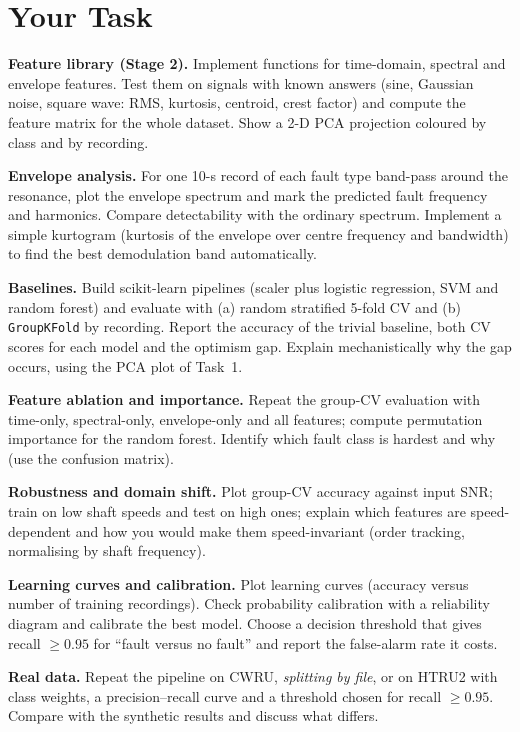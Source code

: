 \documentclass[11pt,a4paper]{article}
\begin{document}
\section*{Your Task}
\begin{tasks}
  \item \textbf{Feature library (Stage 2).} Implement functions for time-domain, spectral and envelope features. Test them on signals with known answers (sine, Gaussian noise, square wave: RMS, kurtosis, centroid, crest factor) and compute the feature matrix for the whole dataset. Show a 2-D PCA projection coloured by class and by recording.
  \item \textbf{Envelope analysis.} For one 10-s record of each fault type band-pass around the resonance, plot the envelope spectrum and mark the predicted fault frequency and harmonics. Compare detectability with the ordinary spectrum. Implement a simple kurtogram (kurtosis of the envelope over centre frequency and bandwidth) to find the best demodulation band automatically.
  \item \textbf{Baselines.} Build scikit-learn pipelines (scaler plus logistic regression, SVM and random forest) and evaluate with (a) random stratified 5-fold CV and (b) \texttt{GroupKFold} by recording. Report the accuracy of the trivial baseline, both CV scores for each model and the optimism gap. Explain mechanistically why the gap occurs, using the PCA plot of Task~1.
  \item \textbf{Feature ablation and importance.} Repeat the group-CV evaluation with time-only, spectral-only, envelope-only and all features; compute permutation importance for the random forest. Identify which fault class is hardest and why (use the confusion matrix).
  \item \textbf{Robustness and domain shift.} Plot group-CV accuracy against input SNR; train on low shaft speeds and test on high ones; explain which features are speed-dependent and how you would make them speed-invariant (order tracking, normalising by shaft frequency).
  \item \textbf{Learning curves and calibration.} Plot learning curves (accuracy versus number of training recordings). Check probability calibration with a reliability diagram and calibrate the best model. Choose a decision threshold that gives recall $\ge0.95$ for ``fault versus no fault'' and report the false-alarm rate it costs.
  \item \textbf{Real data.} Repeat the pipeline on CWRU, \emph{splitting by file}, or on HTRU2 with class weights, a precision--recall curve and a threshold chosen for recall $\ge0.95$. Compare with the synthetic results and discuss what differs.
\end{tasks}
\end{document}
